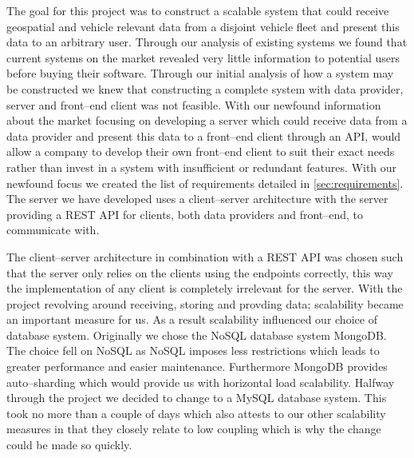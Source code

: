 The goal for this project was to construct a scalable system that could receive geospatial and vehicle relevant data from a disjoint vehicle fleet and present this data to an arbitrary user.
Through our analysis of existing systems we found that current systems on the market revealed very little information to potential users before buying their software.
Through our initial analysis of how a system may be constructed we knew that constructing a complete system with data provider, server and front--end client was not feasible.
With our newfound information about the market focusing on developing a server which could receive data from a data provider and present this data to a front--end client through an API, would allow a company to develop their own front--end client to suit their exact needs rather than invest in a system with insufficient or redundant features.
With our newfound focus we created the list of requirements detailed in \cref{sec:requirements}.
The server we have developed uses a client--server architecture with the server providing a REST API for clients, both data providers and front--end, to communicate with.

\bigskip
The client--server architecture in combination with a REST API was chosen such that the server only relies on the clients using the endpoints correctly, this way the implementation of any client is completely irrelevant for the server.
With the project revolving around receiving, storing and provding data; scalability became an important measure for us.
As a result scalability influenced our choice of database system.
Originally we chose the NoSQL database system MongoDB.
The choice fell on NoSQL as NoSQL imposes less restrictions which leads to greater performance and easier maintenance.
Furthermore MongoDB provides auto--sharding which would provide us with horizontal load scalability.
Halfway through the project we decided to change to a MySQL database system. 
This took no more than a couple of days which also attests to our other scalability measures in that they closely relate to low coupling which is why the change could be made so quickly.

